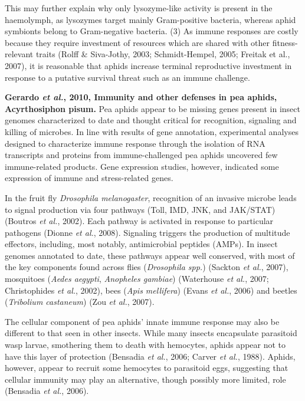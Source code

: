\documentclass[11pt]{article}
\begin{document}
\begin{sloppypar}
This may further explain why only lysozyme-like activity is present in the haemolymph, as lysozymes target mainly Gram-positive bacteria, whereas aphid symbionts belong to Gram-negative bacteria. 
(3) As immune responses are costly because they require investment of resources which are shared with other fitness-relevant traits (Rolff & Siva-Jothy, 2003; Schmidt-Hempel, 2005; Freitak et al., 2007), it is reasonable that aphids increase terminal reproductive investment in response to a putative survival threat such as an immune challenge. 
\par
\textbf{Gerardo \textit{et al.}, 2010, Immunity and other defenses in pea aphids, Acyrthosiphon pisum.} \newline
Pea aphids appear to be missing genes present in insect genomes characterized to date and thought critical for recognition, signaling and killing of microbes. 
In line with results of gene annotation, experimental analyses designed to characterize immune response through the isolation of RNA transcripts and proteins from immune-challenged pea aphids uncovered few immune-related products. 
Gene expression studies, however, indicated some expression of immune and stress-related genes.
\par
In the fruit fly \textit{Drosophila melanogaster}, recognition of an invasive microbe leads to signal production via four pathways (Toll, IMD, JNK, and JAK/STAT) (Boutros \textit{et al.}, 2002). 
Each pathway is activated in response to particular pathogens (Dionne \textit{et al.}, 2008). 
Signaling triggers the production of multitude effectors, including, most notably, antimicrobial peptides (AMPs). 
In insect genomes annotated to date, these pathways appear well conserved, with most of the key components found across flies (\textit{Drosophila spp.}) (Sackton \textit{et al.}, 2007), mosquitoes (\textit{Aedes aegypti}, \textit{Anopheles gambiae}) (Waterhouse \textit{et al.}, 2007; Christophides \textit{et al.}, 2002), bees (\textit{Apis mellifera}) (Evans \textit{et al.}, 2006) and beetles (\textit{Tribolium castaneum}) (Zou \textit{et al.}, 2007).
\par
The cellular component of pea aphids’ innate immune response may also be different to that seen in other insects. 
While many insects encapsulate parasitoid wasp larvae, smothering them to death with hemocytes, aphids appear not to have this layer of protection (Bensadia \textit{et al.}, 2006; Carver \textit{et al.}, 1988). 
Aphids, however, appear to recruit some hemocytes to parasitoid eggs, suggesting that cellular immunity may play an alternative, though possibly more limited, role (Bensadia \textit{et al.}, 2006).

\end{sloppypar}
\end{document}
